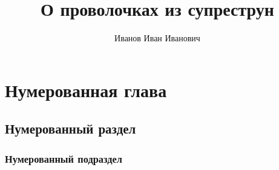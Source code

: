 \documentclass[a4paper,10pt]{report}
\title{О проволочках из супреструн}
\author{Иванов Иван Иванович}
\begin{document}
  \maketitle
  \chapter{Нумерованная глава}
  \label{c:num_chap}
  \section{Нумерованный раздел}
  \label{s:num_sec}
  \subsection{Нумерованный подраздел}
  \label{ss:num_subsec}
\end{document}
